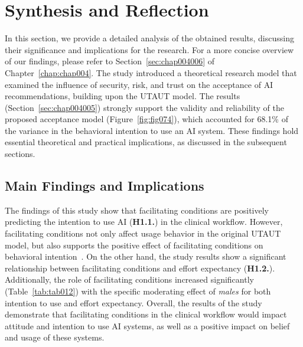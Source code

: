 \section{Synthesis and Reflection}
\label{chap:app003005}

In this section, we provide a detailed analysis of the obtained results, discussing their significance and implications for the research.
For a more concise overview of our findings, please refer to Section~\ref{sec:chap004006} of Chapter~\ref{chap:chap004}.
The study introduced a theoretical research model that examined the influence of security, risk, and trust on the acceptance of \ac{AI} recommendations, building upon the \ac{UTAUT} model.
The results (Section~\ref{sec:chap004005}) strongly support the validity and reliability of the proposed acceptance model (Figure~\ref{fig:fig074}), which accounted for 68.1\% of the variance in the behavioral intention to use an AI system.
These findings hold essential theoretical and practical implications, as discussed in the subsequent sections.

\subsection{Main Findings and Implications}
\label{chap:app003005001}

The findings of this study show that facilitating conditions are positively predicting the intention to use \ac{AI} ({\bf H1.1.}) in the clinical workflow.
However, facilitating conditions not only affect usage behavior in the original UTAUT model, but also supports the positive effect of facilitating conditions on behavioral intention~\cite{DWIVEDI2016174, Seethamraju2018}.
On the other hand, the study results show a significant relationship between facilitating conditions and effort expectancy ({\bf H1.2.}).
Additionally, the role of facilitating conditions increased significantly (Table~\ref{tab:tab012}) with the specific moderating effect of {\it males} for both intention to use and effort expectancy.
Overall, the results of the study demonstrate that facilitating conditions in the clinical workflow would impact attitude and intention to use \ac{AI} systems, as well as a positive impact on belief and usage of these systems.

